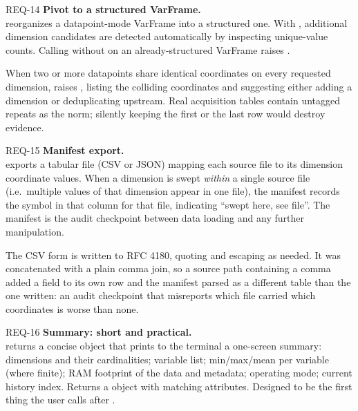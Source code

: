 \begin{reqbox}{REQ-14}{\stable}
\textbf{Pivot to a structured VarFrame.}\\
 reorganizes a datapoint-mode
VarFrame into a structured one. With , additional
dimension candidates are detected automatically by inspecting unique-value
counts. Calling  without  on an already-structured
VarFrame raises .

When two or more datapoints share identical coordinates on every requested
dimension,  raises , listing the
colliding coordinates and suggesting either adding a 
dimension or deduplicating upstream. Real acquisition tables contain
untagged repeats as the norm; silently keeping the first or the last row
would destroy evidence.
\end{reqbox}

\begin{reqbox}{REQ-15}{\stable}
\textbf{Manifest export.}\\
 exports a tabular file (CSV or JSON) mapping each
source file to its dimension coordinate values. When a dimension is swept
\emph{within} a single source file (i.e.\ multiple values of that dimension
appear in one file), the manifest records the symbol \code{*} in that
column for that file, indicating ``swept here, see file''. The manifest is
the audit checkpoint between data loading and any further manipulation.

The CSV form is written to RFC 4180, quoting and escaping as needed. It
was concatenated with a plain comma join, so a source path containing a
comma added a field to its own row and the manifest parsed as a
different table than the one written: an audit checkpoint that
misreports which file carried which coordinates is worse than none.
\end{reqbox}

\begin{reqbox}{REQ-16}{\stable}
\textbf{Summary: short and practical.}\\
 returns a concise object that prints to the terminal a
one-screen summary: dimensions and their cardinalities; variable list;
min/max/mean per variable (where finite); RAM footprint of the data and
metadata; operating mode; current history index. Returns a 
object with matching attributes. Designed to be the first thing the user
calls after .
\end{reqbox}

